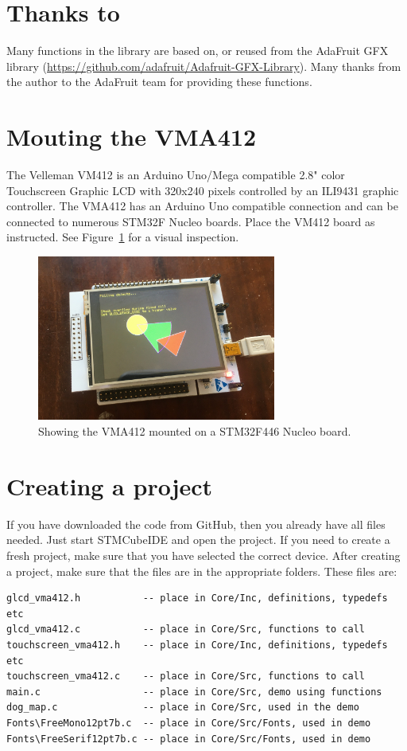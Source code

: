 \documentclass[12pt]{article}
\begin{document}
\section{Thanks to}
Many functions in the library are based on, or reused from the AdaFruit GFX library (\url{https://github.com/adafruit/Adafruit-GFX-Library}). Many thanks from the author to the AdaFruit team for providing these functions.


\section{Mouting the VMA412}
The Velleman VM412 is an Arduino Uno/Mega compatible 2.8" color Touchscreen Graphic LCD with 320x240 pixels controlled by an ILI9431 graphic controller.
The VMA412 has an Arduino Uno compatible connection and can be connected to numerous STM32F Nucleo boards.
Place the VM412 board as instructed. See Figure~\ref{fig:1} for a visual inspection.

\begin{figure}[!ht]
\centering
\includegraphics[width=0.7\textwidth]{glcd_demo}
\caption{Showing the VMA412 mounted on a STM32F446 Nucleo board.}
\label{fig:1}
\end{figure}


\section{Creating a project}
If you have downloaded the code from GitHub, then you already have all files needed. Just start STMCubeIDE and open the project. If you need to create a fresh project, make sure that you have selected the correct device. 
After creating a project, make sure that the files are in the appropriate folders. These files are:

\begin{lstlisting}
glcd_vma412.h           -- place in Core/Inc, definitions, typedefs etc
glcd_vma412.c           -- place in Core/Src, functions to call
touchscreen_vma412.h    -- place in Core/Inc, definitions, typedefs etc
touchscreen_vma412.c    -- place in Core/Src, functions to call
main.c                  -- place in Core/Src, demo using functions
dog_map.c               -- place in Core/Src, used in the demo
Fonts\FreeMono12pt7b.c  -- place in Core/Src/Fonts, used in demo
Fonts\FreeSerif12pt7b.c -- place in Core/Src/Fonts, used in demo
\end{lstlisting}
\end{document}
